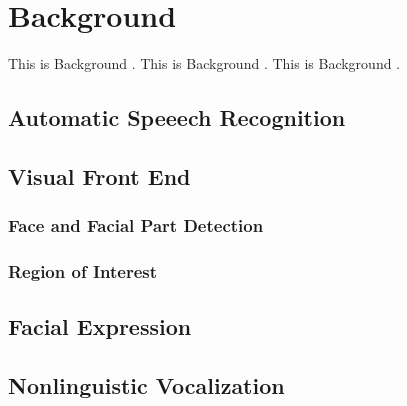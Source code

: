\chapter{Background}
This is Background \cite{matthews2004active}.
This is Background \cite{xiong2013supervised }.
This is Background \cite{potamianos2003recent }.
\section{Automatic Speeech Recognition}
\section{Visual Front End}
\subsection{Face and Facial Part Detection}
\subsection{Region of Interest}
\section{Facial Expression}
\section{Nonlinguistic Vocalization}